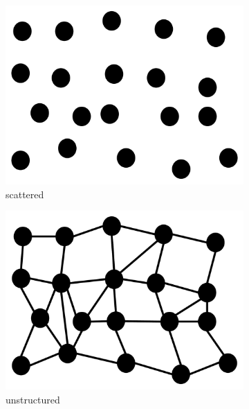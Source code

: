 \begin{figure}
  \begin{subfigure}[b]{0.19\textwidth}
    \includegraphics[width=\textwidth]{Images/scattered.pdf}
    \caption{scattered}
    \label{fig:scattered}
  \end{subfigure}
  \begin{subfigure}[b]{0.2\textwidth}
    \includegraphics[width=\textwidth]{Images/unstructured.pdf}
    \caption{unstructured}
    \label{fig:unstructured}
  \end{subfigure}
  \begin{subfigure}[b]{0.2\textwidth}

\end{subfigure}
\end{figure}
